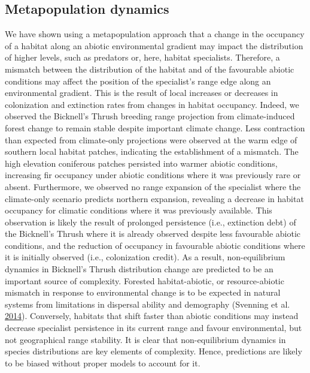 \documentclass[12pt]{article}
\begin{document}
\hypertarget{metapopulation-dynamics}{%
\subsection{Metapopulation dynamics}\label{metapopulation-dynamics}}

We have shown using a metapopulation approach that a change in the
occupancy of a habitat along an abiotic environmental gradient may
impact the distribution of higher levels, such as predators or, here,
habitat specialists. Therefore, a mismatch between the distribution of
the habitat and of the favourable abiotic conditions may affect the
position of the specialist's range edge along an environmental gradient.
This is the result of local increases or decreases in colonization and
extinction rates from changes in habitat occupancy. Indeed, we observed
the Bicknell's Thrush breeding range projection from climate-induced
forest change to remain stable despite important climate change. Less
contraction than expected from climate-only projections were observed at
the warm edge of southern local habitat patches, indicating the
establishment of a mismatch. The high elevation coniferous patches
persisted into warmer abiotic conditions, increasing fir occupancy under
abiotic conditions where it was previously rare or absent. Furthermore,
we observed no range expansion of the specialist where the climate-only
scenario predicts northern expansion, revealing a decrease in habitat
occupancy for climatic conditions where it was previously available.
This observation is likely the result of prolonged persistence (i.e.,
extinction debt) of the Bicknell's Thrush where it is already observed
despite less favourable abiotic conditions, and the reduction of
occupancy in favourable abiotic conditions where it is initially
observed (i.e., colonization credit). As a result, non-equilibrium
dynamics in Bicknell's Thrush distribution change are predicted to be an
important source of complexity. Forested habitat-abiotic, or
resource-abiotic mismatch in response to environmental change is to be
expected in natural systems from limitations in dispersal ability and
demography (Svenning et al.
\protect\hyperlink{ref-svenning_influence_2014}{2014}). Conversely,
habitats that shift faster than abiotic conditions may instead decrease
specialist persistence in its current range and favour environmental,
but not geographical range stability. It is clear that non-equilibrium
dynamics in species distributions are key elements of complexity. Hence,
predictions are likely to be biased without proper models to account for
it.
\end{document}
